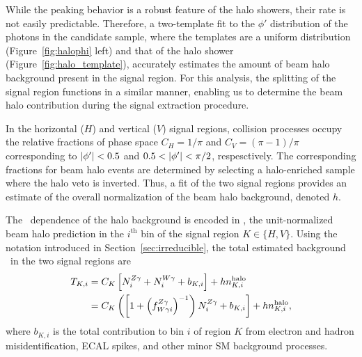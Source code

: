 While the peaking behavior is a robust feature of the halo showers, their rate is not easily predictable. 
Therefore,  a two-template fit to the $\phi'$ distribution of the photons in the candidate sample, where the templates are a uniform distribution (Figure~\ref{fig:halophi} left) and that of the halo shower (Figure~\ref{fig:halo_template}), accurately estimates the amount of beam halo background present in the signal region. 
For this analysis, the splitting of the signal region functions in a similar manner, enabling us to determine the beam halo contribution during the signal extraction procedure.

In the horizontal ($H$) and vertical ($V$) signal regions, collision processes occupy the relative fractions of phase space $C_{H} = 1/\pi$ and $C_{V} = (\pi-1)/\pi$ corresponding to $\abs{\phi'} < 0.5$ and $0.5 < \abs{\phi'} < \pi/2$, respesctively. 
The corresponding fractions for beam halo events are determined by selecting a halo-enriched sample where the halo veto is inverted. 
Thus, a fit of the two signal regions provides an estimate of the overall normalization of the beam halo background, denoted $h$.
 
The \ETg\ dependence of the halo background is encoded in \nhalo[,i], the unit-normalized beam halo prediction in the $i^\mathrm{th}$ bin of the signal region $K \in \{H,V\}$.
Using the notation introduced in Section~\ref{sec:irreducible}, the total estimated background \TK\ in the two signal regions are
\begin{equation}
\begin{aligned}
  \TK[,i] & = C_{K} \left[ \NZg[i] + \NWg[i] + b_{K,i}\right] + h \nhalo[,i]  \\
          & = C_{K} \left( \left[1 + \left(\fZW[i]\right)^{-1}\right) \NZg[i] + b_{K,i}\right] + h \nhalo[,i],
\end{aligned}
\end{equation}
where $b_{K,i}$ is the total contribution to bin $i$ of region $K$ from electron and hadron misidentification, ECAL spikes, and other minor SM background processes.
